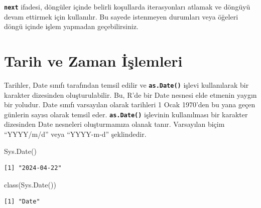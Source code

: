 \documentclass[
  letterpaper,
  DIV=11,
  numbers=noendperiod]{scrreprt}
\newenvironment{Shaded}{\begin{snugshade}}{\end{snugshade}}
\newcommand{\FunctionTok}[1]{\textcolor[rgb]{0.28,0.35,0.67}{#1}}
\newcommand{\NormalTok}[1]{\textcolor[rgb]{0.00,0.23,0.31}{#1}}
\begin{document}
\begin{tcolorbox}[enhanced jigsaw, colback=white, coltitle=black, colbacktitle=quarto-callout-note-color!10!white, opacitybacktitle=0.6, opacityback=0, toprule=.15mm, bottomrule=.15mm, bottomtitle=1mm, rightrule=.15mm, breakable, arc=.35mm, colframe=quarto-callout-note-color-frame, titlerule=0mm, left=2mm, leftrule=.75mm, toptitle=1mm, title=\textcolor{quarto-callout-note-color}{\faInfo}\hspace{0.5em}{Not}]

\textbf{\texttt{next}} ifadesi, döngüler içinde belirli koşullarda
iterasyonları atlamak ve döngüyü devam ettirmek için kullanılır. Bu
sayede istenmeyen durumları veya öğeleri döngü içinde işlem yapmadan
geçebilirsiniz.

\end{tcolorbox}

\chapter{Tarih ve Zaman İşlemleri}\label{tarih-ve-zaman-iux15flemleri}

Tarihler, Date sınıfı tarafından temsil edilir ve
\textbf{\texttt{as.Date()}} işlevi kullanılarak bir karakter dizesinden
oluşturulabilir. Bu, R'de bir Date nesnesi elde etmenin yaygın bir
yoludur. Date sınıfı varsayılan olarak tarihleri 1 Ocak 1970'den bu yana
geçen günlerin sayısı olarak temsil eder. \textbf{\texttt{as.Date()}}
işlevinin kullanılması bir karakter dizesinden Date nesneleri
oluşturmamıza olanak tanır. Varsayılan biçim ``YYYY/m/d'' veya
``YYYY-m-d'' şeklindedir.

\begin{Shaded}
\begin{Highlighting}[]
\FunctionTok{Sys.Date}\NormalTok{()}
\end{Highlighting}
\end{Shaded}

\begin{verbatim}
[1] "2024-04-22"
\end{verbatim}

\begin{Shaded}
\begin{Highlighting}[]
\FunctionTok{class}\NormalTok{(}\FunctionTok{Sys.Date}\NormalTok{())}
\end{Highlighting}
\end{Shaded}

\begin{verbatim}
[1] "Date"
\end{verbatim}
\end{document}
